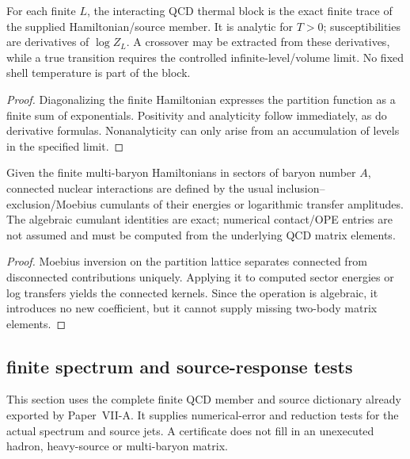 \documentclass[12pt,a4paper]{article}
\begin{document}
\begin{theorem}
\label{p11:thm:block-e-thermal-finite-trace}

For each finite \(L\), the interacting QCD thermal block is the exact finite trace of the supplied Hamiltonian/source member.  It is analytic for \(T>0\); susceptibilities are derivatives of \(\log Z_L\).  A crossover may be extracted from these derivatives, while a true transition requires the controlled infinite-level/volume limit.  No fixed shell temperature is part of the block.
\label{p11:eq:block-e-finite-thermal-trace}
\end{theorem}
\begin{proof}

Diagonalizing the finite Hamiltonian expresses the partition function as a finite sum of exponentials.  Positivity and analyticity follow immediately, as do derivative formulas.  Nonanalyticity can only arise from an accumulation of levels in the specified limit.
\end{proof}

\begin{theorem}
\label{p11:thm:block-f-nuclear-transfer-cumulants}

Given the finite multi-baryon Hamiltonians in sectors of baryon number \(A\), connected nuclear interactions are defined by the usual inclusion--exclusion/Moebius cumulants of their energies or logarithmic transfer amplitudes.  The algebraic cumulant identities are exact; numerical contact/OPE entries are not assumed and must be computed from the underlying QCD matrix elements.

\end{theorem}
\begin{proof}

Moebius inversion on the partition lattice separates connected from disconnected contributions uniquely.  Applying it to computed sector energies or log transfers yields the connected kernels.  Since the operation is algebraic, it introduces no new coefficient, but it cannot supply missing two-body matrix elements.
\end{proof}


\subsection{finite spectrum and source-response tests}
\label{p11:sec:v2210-lit-readout-tests}
This section uses the complete finite QCD member and source dictionary
already exported by Paper~VII-A. It supplies numerical-error and reduction
tests for the actual spectrum and source jets. A certificate does not fill
in an unexecuted hadron, heavy-source or multi-baryon matrix.
\end{document}
